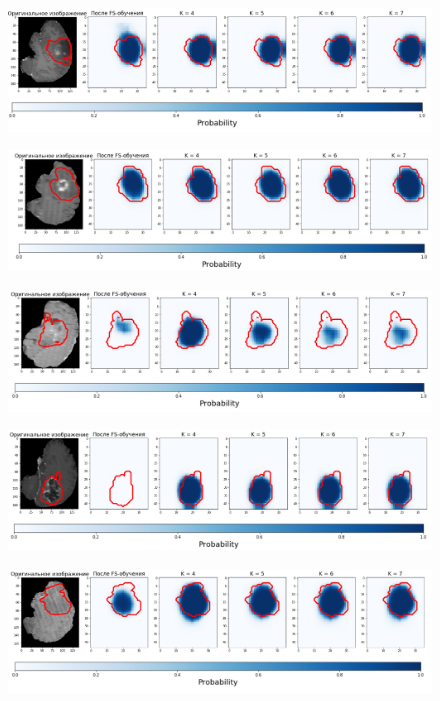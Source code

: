 \begin{figure}[h!] 
  \center
  \includegraphics [scale=0.7] {images/good_4.png}
\end{figure}


\begin{figure}[h!] 
  \center
  \includegraphics [scale=0.7] {images/good_5.png}
\end{figure}


\begin{figure}[h!] 
  \center
  \includegraphics [scale=0.7] {images/good_6.png}
\end{figure}

\begin{figure}[h!] 
  \center
  \includegraphics [scale=0.7] {images/good_7.png}
\end{figure}

\begin{figure}[h!] 
  \center
  \includegraphics [scale=0.7] {images/good_8.png}
\end{figure}

